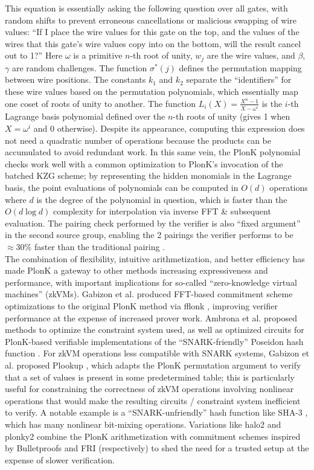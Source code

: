 \noindent This equation is essentially asking the following question over all gates, with random shifts to prevent erroneous cancellations or malicious swapping of wire values: ``If I place the wire values for this gate on the top, and the values of the wires that this gate's wire values copy into on the bottom, will the result cancel out to 1?'' Here $\omega$ is a primitive $n$-th root of unity, $w_j$ are the wire values, and $\beta$, $\gamma$ are random challenges. The function $\sigma^*(j)$ defines the permutation mapping between wire positions. The constants $k_1$ and $k_2$ separate the ``identifiers'' for these wire values based on the permutation polynomials, which essentially map one coset of roots of unity to another. The function $L_i(X) = \frac{X^n - 1}{X - \omega^i}$ is the $i$-th Lagrange basis polynomial defined over the $n$-th roots of unity (gives 1 when $X = \omega^i$ and 0 otherwise). Despite its appearance, computing this expression does not need a quadratic number of operations because the products can be accumulated to avoid redundant work. In this same vein, the PlonK polynomial checks work well with a common optimization to PlonK's invocation of the batched KZG scheme; by representing the hidden monomials in the Lagrange basis, the point evaluations of polynomials can be computed in $O(d)$ operations where $d$ is the degree of the polynomial in question, which is faster than the $O(d \log d)$ complexity for interpolation via inverse FFT \& subsequent evaluation. The pairing check performed by the verifier is also ``fixed argument'' in the second source group, enabling the 2 pairings the verifier performs to be $\approx30\%$ faster than the traditional pairing \cite{fapairings}.\\

\noindent The combination of flexibility, intuitive arithmetization, and better efficiency has made PlonK a gateway to other methods increasing expressiveness and performance, with important implications for so-called ``zero-knowledge virtual machines'' (zkVMs). Gabizon et al. produced FFT-based commitment scheme optimizations to the original PlonK method via fflonk \cite{fflonk}, improving verifier performance at the expense of increased prover work. Ambrona et al. \cite{turboplonk} proposed methods to optimize the constraint system used, as well as optimized circuits for PlonK-based verifiable implementations of the ``SNARK-friendly'' Poseidon hash function \cite{poseidon}. For zkVM operations less compatible with SNARK systems, Gabizon et al. proposed Plookup \cite{plookup}, which adapts the PlonK permutation argument to verify that a set of values is present in some predetermined table; this is particularly useful for constraining the correctness of zkVM operations involving nonlinear operations that would make the resulting circuits / constraint system inefficient to verify. A notable example is a ``SNARK-unfriendly'' hash function like SHA-3 \cite{sha3}, which has many nonlinear bit-mixing operations. Variations like halo2 \cite{halo2} and plonky2 \cite{plonky2} combine the PlonK arithmetization with commitment schemes inspired by Bulletproofs \cite{bulletproofs} and FRI \cite{fri} (respectively) to shed the need for a trusted setup at the expense of slower verification. \\

